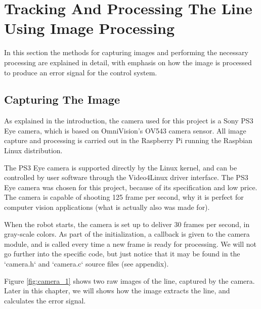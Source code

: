 \chapter{Tracking And Processing The Line Using Image Processing}
\label{chap:camera}

In this section the methods for capturing images and performing the necessary processing are explained in detail, with emphasis on how the image is processed to produce an error signal for the control system.

%
%
%
%
\section{Capturing The Image}
As explained in the introduction, the camera used for this project is a Sony PS3 Eye camera, which is based on OmniVision's OV543 camera sensor. All image capture and processing is carried out in the Raspberry Pi running the Raspbian Linux distribution.

The PS3 Eye camera is supported directly by the Linux kernel, and can be controlled by user software through the Video4Linux driver interface. The PS3 Eye camera was chosen for this project, because of its specification and low price. The camera is capable of shooting 125 frame per second, why it is perfect for computer vision applications (what is actually also was made for).

When the robot starts, the camera is set up to deliver 30 frames per second, in gray-scale colors. As part of the initialization, a callback is given to the camera module, and is called every time a new frame is ready for processing. We will not go further into the specific code, but just notice that it may be found in the `camera.h` and `camera.c` source files (see appendix). 

Figure \ref{fig:camera_1} shows two raw images of the line, captured by the camera. Later in this chapter, we will shows how the image extracts the line, and calculates the error signal.

